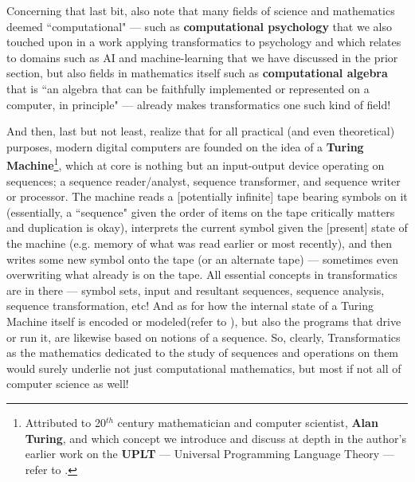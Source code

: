 \documentclass[a4paper, 18pt]{book} %
\begin{document}
\begin{appendices}
\vspace{2em}

Concerning that last bit, also note that many fields of science and mathematics deemed ``computational" --- such as \textbf{computational psychology}\cite{illingworth1996computing} that we also touched upon in a work applying transformatics to psychology\cite{Lutalo2025transpsy} and which relates to domains such as AI and machine-learning that we have discussed in the prior section, but also fields in mathematics itself such as \textbf{computational algebra} that is ``an algebra that can be faithfully implemented or represented on a computer, in principle"\cite{illingworth1996computing} --- already makes transformatics one such kind of field!

\vspace{2em}


And then, last but not least, realize that for all practical (and even theoretical) purposes, modern digital computers are founded on the idea of a \textbf{Turing Machine}\footnote{Attributed to 20$^{th}$ century mathematician and computer scientist, \textbf{Alan Turing}, and which concept we introduce and discuss at depth in the author's earlier work on the \textbf{UPLT} --- Universal Programming Language Theory --- refer to \cite{lutalo2024software}.}\cite{illingworth1996computing}, which at core is nothing but an input-output device operating on sequences; a sequence reader/analyst, sequence transformer, and sequence writer or processor. The machine reads a [potentially infinite] tape bearing symbols on it (essentially, a ``sequence" given the order of items on the tape critically matters and duplication is okay), interprets the current symbol given the [present] state of the machine (e.g. memory of what was read earlier or most recently), and then writes some new symbol onto the tape (or an alternate tape) --- sometimes even overwriting what already is on the tape. All essential concepts in transformatics are in there --- symbol sets, input and resultant sequences, sequence analysis, sequence transformation, etc! And as for how the internal state of a Turing Machine itself is encoded or modeled(refer to \cite{lutalo2024software}), but also the programs that drive or run it, are likewise based on notions of a sequence. So, clearly, Transformatics as the mathematics dedicated to the study of sequences and operations on them would surely underlie not just computational mathematics, but most if not all of computer science as well!




\end{appendices}
\end{document}
